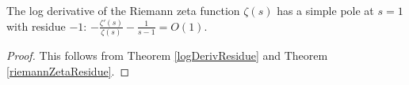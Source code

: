 \begin{theorem}[riemannZetaLogDerivResidue]
\label{riemannZetaLogDerivResidue}
\leanok
The log derivative of the Riemann zeta function $\zeta(s)$ has a simple pole at $s=1$ with
  residue $-1$: $-\frac{\zeta'(s)}{\zeta(s)} - \frac{1}{s-1} = O(1)$.
\end{theorem}
\begin{proof}
\leanok
This follows from Theorem \ref{logDerivResidue} and Theorem \ref{riemannZetaResidue}.
\end{proof}
